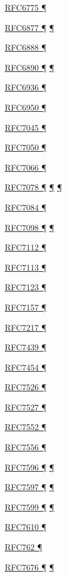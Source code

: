 \documentclass[
]{article}
\begin{document}
\hyperref[address-resolution]{RFC6775 ¶}

\hyperref[dual-stack-scenarios]{RFC6877 ¶}
\hyperref[translation-and-ipv4-as-a-service]{¶}

\hyperref[dual-stack-scenarios]{RFC6888 ¶}

\hyperref[addresses]{RFC6890 ¶} \hyperref[filtering]{¶}

\hyperref[transport-protocols]{RFC6936 ¶}

\hyperref[multi-prefix-operation]{RFC6950 ¶}

\hyperref[filtering]{RFC7045 ¶}

\hyperref[obsolete-techniques]{RFC7050 ¶}

\hyperref[managed-configuration]{RFC7066 ¶}

\hyperref[dns]{RFC7078 ¶}
\hyperref[source-and-destination-address-selection]{¶}
\hyperref[multi-prefix-operation]{¶}

\hyperref[routing]{RFC7084 ¶}

\hyperref[traffic-class-and-flow-label]{RFC7098 ¶}
\hyperref[topology-obfuscation]{¶}

\hyperref[layer-2-considerations]{RFC7112 ¶}

\hyperref[layer-2-considerations]{RFC7113 ¶}

\hyperref[filtering]{RFC7123 ¶}

\hyperref[multihoming]{RFC7157 ¶}

\hyperref[security-operation]{RFC7217 ¶}

\hyperref[tunnels]{RFC7439 ¶}

\hyperref[filtering]{RFC7454 ¶}

\hyperref[obsolete-techniques]{RFC7526 ¶}

\hyperref[auto-configuration]{RFC7527 ¶}

\hyperref[tunnels]{RFC7552 ¶}

\hyperref[multihoming]{RFC7556 ¶}

\hyperref[dual-stack-scenarios]{RFC7596 ¶}
\hyperref[translation-and-ipv4-as-a-service]{¶}

\hyperref[dual-stack-scenarios]{RFC7597 ¶}
\hyperref[translation-and-ipv4-as-a-service]{¶}

\hyperref[dual-stack-scenarios]{RFC7599 ¶}
\hyperref[translation-and-ipv4-as-a-service]{¶}

\hyperref[layer-2-considerations]{RFC7610 ¶}

\hyperref[why-version-6]{RFC762 ¶}

\hyperref[layer-2-functions]{RFC7676 ¶} \hyperref[tunnels]{¶}
\end{document}
